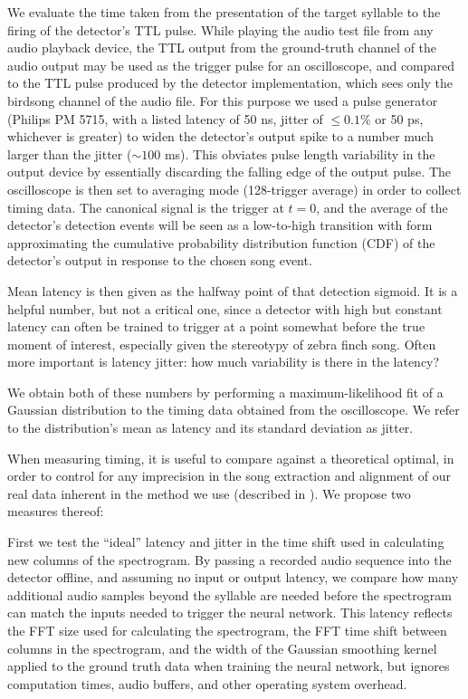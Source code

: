 \documentclass[10pt,letterpaper]{article}
\begin{document}
We evaluate the time taken from the presentation of the target
syllable to the firing of the detector's TTL pulse. While playing the
audio test file from any audio playback device, the TTL
output from the ground-truth channel of the audio output may be used
as the trigger pulse for an oscilloscope, and compared to the TTL pulse
produced by the detector implementation, which sees only the birdsong channel
of the audio file. For this purpose we used a pulse
generator (Philips PM 5715, with a listed latency of 50 ns, jitter 
of $\leq 0.1\%$ or 50 ps, whichever is greater) to widen the
detector's output spike to a number much larger than the jitter ($\sim 100$ ms).  This obviates pulse length variability in the output device by essentially discarding the falling edge of the output pulse.  The oscilloscope is then set to
averaging mode (128-trigger average) in order to collect timing data. The canonical signal is the trigger at $t=0$, and the
average of the detector's detection events will be seen as a
low-to-high transition with form approximating the cumulative
probability distribution function (CDF) of the detector's output in
response to the chosen song event.

Mean latency is then given as the halfway point of that detection
sigmoid. It is a helpful number, but not a critical one, since a
detector with high but constant latency can often be trained to trigger at a
point somewhat before the true moment of interest, especially given the stereotypy of zebra finch song.  Often more
important is latency jitter: how much variability is there in
the latency?

We obtain both of these numbers by performing a maximum-likelihood fit of a Gaussian distribution to the timing data obtained from the oscilloscope.  We refer to the distribution's mean as latency and its standard deviation as jitter.

When measuring timing, it is useful to compare against a theoretical optimal, in order to control for any imprecision in the song extraction
and alignment of our real data inherent in the method we use (described in
\cite{Poole2012}).  We propose two measures thereof:

First we test the ``ideal'' latency and jitter in the time shift used in 
calculating new columns of the spectrogram. By passing a recorded 
audio sequence into the detector offline, and assuming no input or output 
latency, we compare how many additional audio 
samples beyond the syllable are needed before the spectrogram 
can match the inputs needed to trigger the neural network.  This latency reflects the 
FFT size used for calculating the spectrogram, the FFT time shift 
between columns in the spectrogram, and the width of the Gaussian 
smoothing kernel applied to the ground truth data when training 
the neural network, but ignores computation times, audio buffers, and other operating system overhead.
\end{document}
